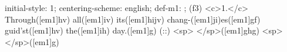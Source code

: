 initial-style: 1;
centering-scheme: english;
def-m1: \grealign;
(f3) <c>1.</c> Through([em1]hv) all([em1]iv) its([em1]hijv) chang-([em1]ji)es([em1]gf) guid'st([em1]hv) the([em1]ih) day.([em1]g) (::) <sp> </sp>([em1]ghg) <sp>   </sp>([em1]g)